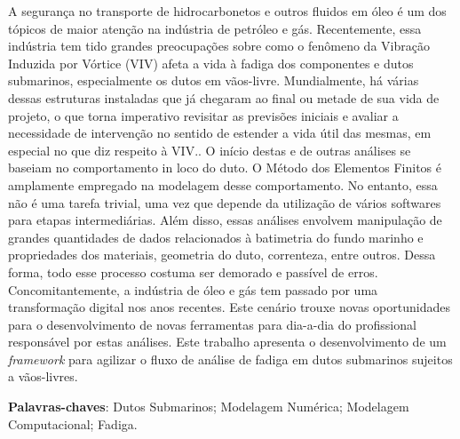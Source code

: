 
\setlength{\absparsep}{18pt} %
\begin{resumo}

    A segurança no transporte de hidrocarbonetos e outros fluidos em óleo é um dos tópicos de maior atenção na indústria de petróleo e gás.
    Recentemente, essa indústria tem tido grandes preocupações sobre como o fenômeno da Vibração Induzida por Vórtice (VIV) afeta a vida à fadiga dos componentes e dutos submarinos, especialmente os dutos em vãos-livre.
    Mundialmente, há várias dessas estruturas instaladas que já chegaram ao final ou metade de sua vida de projeto, o que torna imperativo revisitar as previsões iniciais e avaliar a necessidade de intervenção no sentido de estender a vida útil das mesmas, em especial no que diz respeito à VIV..
    O início destas e de outras análises se baseiam no comportamento in loco do duto.
    O Método dos Elementos Finitos é amplamente empregado na modelagem desse comportamento.
    No entanto, essa não é uma tarefa trivial, uma vez que depende da utilização de vários softwares para etapas intermediárias.
    Além disso, essas análises envolvem manipulação de grandes quantidades de dados relacionados à batimetria do fundo marinho e propriedades dos materiais, geometria do duto, correnteza, entre outros.
    Dessa forma, todo esse processo costuma ser demorado e passível de erros.
    Concomitantemente, a indústria de óleo e gás tem passado por uma transformação digital nos anos recentes.
    Este cenário trouxe novas oportunidades para o desenvolvimento de novas ferramentas para dia-a-dia do profissional responsável por estas análises.
    Este trabalho apresenta o desenvolvimento de um \textit{framework}  para agilizar o fluxo de análise de fadiga em dutos submarinos sujeitos a vãos-livres.



 \textbf{Palavras-chaves}: Dutos Submarinos; Modelagem Numérica; Modelagem Computacional; Fadiga.
\end{resumo}

